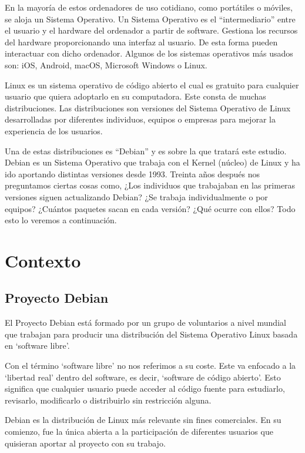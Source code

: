 \documentclass[a4paper, 12pt]{book}
\begin{document}
En la mayoría de estos ordenadores de uso cotidiano, como portátiles o móviles, se aloja un Sistema Operativo. Un Sistema Operativo es el “intermediario” entre el usuario y el hardware del ordenador a partir de software. Gestiona los recursos del hardware proporcionando una interfaz al usuario. De esta forma pueden interactuar con dicho ordenador. 
Algunos de los sistemas operativos más usados son: iOS, Android, macOS, Microsoft Windows o Linux. 

Linux es un sistema operativo de código abierto el cual es gratuito para cualquier usuario que quiera adoptarlo en su computadora. Este consta de muchas distribuciones. Las distribuciones son versiones del Sistema Operativo de Linux desarrolladas por diferentes individuos, equipos o empresas para mejorar la experiencia de los usuarios.

Una de estas distribuciones es “Debian” y es sobre la que tratará este estudio.
Debian es un Sistema Operativo que trabaja con el Kernel (núcleo) de Linux y ha ido aportando distintas versiones desde 1993. 
Treinta años después nos preguntamos ciertas cosas como, ¿Los individuos que trabajaban en las primeras versiones siguen actualizando Debian? ¿Se trabaja individualmente o por equipos? ¿Cuántos paquetes sacan en cada versión? ¿Qué ocurre con ellos? Todo esto lo veremos a continuación.



\section{Contexto}
\label{sec:contexto}



\subsection{Proyecto Debian}
\label{subsec:proyecto debian}

El Proyecto Debian está formado por un grupo de voluntarios a nivel mundial que trabajan para producir una distribución del Sistema Operativo Linux basada en `software libre'.

Con el término `software libre' no nos referimos a su coste. Este va enfocado a la `libertad real' dentro del software, es decir, `software de código abierto'.
Esto significa que cualquier usuario puede acceder al código fuente para estudiarlo, revisarlo, modificarlo o distribuirlo sin restricción alguna.

Debian es la distribución de Linux más relevante sin fines comerciales.
En su comienzo, fue la única abierta a la participación de diferentes usuarios que quisieran aportar al proyecto con su trabajo.
\end{document}
